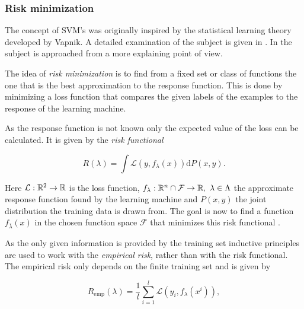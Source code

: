 \subsubsection{Risk minimization}
The concept of SVM's was originally inspired by the statistical learning theory developed by Vapnik. A detailed examination of the subject is given in \cite{Vapnik1998}. In \cite{Vapnik2013} the subject is approached from a more explaining point of view.

The idea of \emph{risk minimization} is to find from a fixed set or class of functions the one that is the best approximation to the response function. This is done by minimizing a loss function that compares the given labels of the examples to the response of the learning machine.

As the response function is not known only the expected value of the loss can be calculated. It is given by the \emph{risk functional} 

\begin{equation}
	R(\lambda) = \int{\mathcal{L}(y,f_{\lambda}(x))\text{d}P(x,y)}.
\label{risk_func}
\end{equation}

Here \(\mathcal{L}: \mathbb{R}^2 \to \mathbb{R}\) is the loss function, \(f_{\lambda}: \mathbb{R}^{n}\cap\mathcal{F} \to \mathbb{R}, ~ \lambda \in \Lambda\) the approximate response function found by the learning machine and \(P(x,y)\) the joint distribution the training data is drawn from. The goal is now to find a function \(f_{\bar{\lambda}}(x)\) in the chosen function space \(\mathcal{F}\) that minimizes this risk functional \cite[989]{Vapnik1999}.

As the only given information is provided by the training set inductive principles are used to work with the \emph{empirical risk}, rather than with the risk functional.
The empirical risk only depends on the finite training set  and is given by 


\begin{equation}
	R_{\text{emp}}(\lambda) = \frac{1}{l} \sum_{i = 1}^{l}\mathcal{L}(y_i,f_{\lambda}(x^i)),
\label{emp_risk}
\end{equation}

